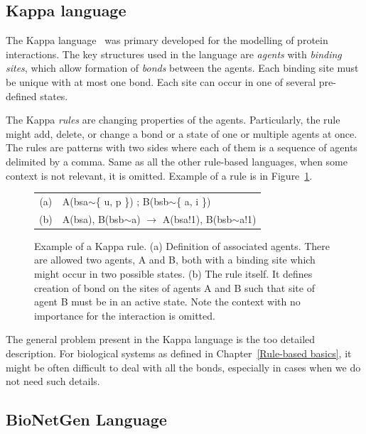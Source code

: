 \documentclass[12pt, twoside]{fithesis2} %
\begin{document}
\subsection{Kappa language}
\label{kappa}

The Kappa language~\cite{kappa_formal} was primary developed for the modelling of protein interactions. The key structures used in the language are \emph{agents} with \emph{binding sites}, which allow formation of \emph{bonds} between the agents. Each binding site must be unique with at most one bond. Each site can occur in one of several pre-defined states.

The Kappa \emph{rules} are changing properties of the agents. Particularly, the rule might add, delete, or change a bond or a state of one or multiple agents at once. The rules are patterns with two sides where each of them is a sequence of agents delimited by a comma. Same as all the other rule-based languages, when some context is not relevant, it is omitted. Example of a rule is in Figure~\ref{kappa-rule}.

\begin{figure}[!h]
\begin{center}
\begin{tabular}{c l}
(a) & A(bsa$\sim$\{ u, p \}) ; B(bsb$\sim$\{ a, i \}) \\
(b) & A(bsa), B(bsb$\sim$a) $\rightarrow$ A(bsa!1), B(bsb$\sim$a!1) \\
\end{tabular}
\end{center}
\caption{Example of a Kappa rule. (a) Definition of associated agents. There are allowed two agents, A and B, both with a binding site which might occur in two possible states. (b) The rule itself. It defines creation of bond on the sites of agents A and B such that site of agent B must be in an active state. Note the context with no importance for the interaction is omitted.}\label{kappa-rule}
\end{figure}

The general problem present in the Kappa language is the too detailed description. For biological systems as defined in Chapter~\ref{Rule-based basics}, it might be often difficult to deal with all the bonds, especially in cases when we do not need such details.

\subsection{BioNetGen Language}
\label{bngl}
\end{document}
